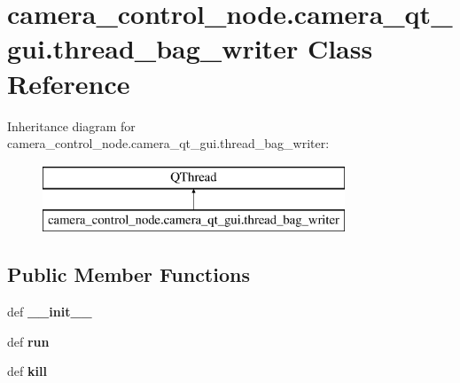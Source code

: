 \hypertarget{classcamera__control__node_1_1camera__qt__gui_1_1thread__bag__writer}{\section{camera\-\_\-control\-\_\-node.\-camera\-\_\-qt\-\_\-gui.\-thread\-\_\-bag\-\_\-writer Class Reference}
\label{classcamera__control__node_1_1camera__qt__gui_1_1thread__bag__writer}
}
Inheritance diagram for camera\-\_\-control\-\_\-node.\-camera\-\_\-qt\-\_\-gui.\-thread\-\_\-bag\-\_\-writer\-:\begin{figure}[H]
\begin{center}
\leavevmode
\includegraphics[height=2.000000cm]{classcamera__control__node_1_1camera__qt__gui_1_1thread__bag__writer}
\end{center}
\end{figure}
\subsection*{Public Member Functions}
\begin{DoxyCompactItemize}
\item 
\hypertarget{classcamera__control__node_1_1camera__qt__gui_1_1thread__bag__writer_a7f39f39449e3067a0207da3a9302b2f4}{def {\bfseries \-\_\-\-\_\-init\-\_\-\-\_\-}}\label{classcamera__control__node_1_1camera__qt__gui_1_1thread__bag__writer_a7f39f39449e3067a0207da3a9302b2f4}

\item 
\hypertarget{classcamera__control__node_1_1camera__qt__gui_1_1thread__bag__writer_afdcf20619393441fd713c407db595944}{def {\bfseries run}}\label{classcamera__control__node_1_1camera__qt__gui_1_1thread__bag__writer_afdcf20619393441fd713c407db595944}

\item 
\hypertarget{classcamera__control__node_1_1camera__qt__gui_1_1thread__bag__writer_a420f8844759e32b87ae27908d1291f0c}{def {\bfseries kill}}\label{classcamera__control__node_1_1camera__qt__gui_1_1thread__bag__writer_a420f8844759e32b87ae27908d1291f0c}

\end{DoxyCompactItemize}
